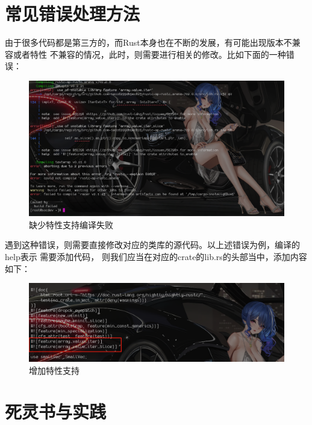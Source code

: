 \section{常见错误处理方法}
由于很多代码都是第三方的，而Rust本身也在不断的发展，有可能出现版本不兼容或者特性
不兼容的情况，此时，则需要进行相关的修改。比如下面的一种错误：
\begin{figure}[H]
  \centering
  \includegraphics[width=\linewidth]{rust_feature_error.png}
  \caption{缺少特性支持编译失败}
  \label{fig:rust_feature_error}
\end{figure}
遇到这种错误，则需要直接修改对应的类库的源代码。以上述错误为例，编译的help表示
需要添加代码，
则我们应当在对应的crate的lib.rs的头部当中，添加内容如下：
\begin{figure}[H]
  \centering
  \includegraphics[width=\linewidth]{rust_feature_add.png}
  \caption{增加特性支持}
  \label{fig:rust_feature_add}
\end{figure}

\section{死灵书与实践}

